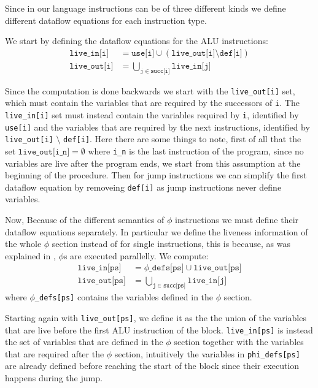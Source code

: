 Since in our language instructions can be of three different kinds we define different dataflow equations for each instruction type.

We start by defining the dataflow equations for the ALU instructions:
\begin{align*}
  \texttt{live\_in[i]} &= \texttt{use[i]} \cup (\texttt{live\_out[i]} \setminus \texttt{def[i]}) \\
  \texttt{live\_out[i]} &= \bigcup \limits_{\texttt j \in \texttt{succ[i]}} \texttt{live\_in[j]}
\end{align*}

Since the computation is done backwards we start with the \texttt{live\_out[i]} set, which must contain the variables that are required by the successors of \texttt i. The
\texttt{live\_in[i]} set must instead contain the variables required by \texttt i, identified by \texttt{use[i]} and the variables that are required by the next instructions, identified by \texttt{live\_out[i]} $\setminus$ \texttt{def[i]}.
Here there are some things to note, first of all that the set $\texttt{live\_out[i\_n]} = \emptyset$ where \texttt{i\_n} is the last instruction of the program, since no variables are live after the program ends, we start from this assumption at the beginning of the procedure.
Then for jump instructions we can simplify the first dataflow equation by removeing \texttt{def[i]} as jump instructions never define variables.

Now, Because of the different semantics of $\phi$ instructions we must define their dataflow equations separately. In particular we define the liveness information of the whole $\phi$ section instead of for single instructions, this is because, as was explained in , $\phi$s are executed parallelly.
We compute:
\begin{align*}
  \texttt{live\_in[ps]} &= \texttt{$\phi$\_defs[ps]} \cup \texttt{live\_out[ps]} \\
  \texttt{live\_out[ps]} &= \bigcup \limits_{\texttt j \in \texttt{succ[ps]}} \texttt{live\_in[j]}
\end{align*}
where \texttt{$\phi$\_defs[ps]} contains the variables defined in the $\phi$ section.

Starting again with \texttt{live\_out[ps]}, we define it as the the union of the variables that are live before the first ALU instruction of the block. \texttt{live\_in[ps]} is instead the set of variables that are defined in the $\phi$ section together with the variables that are required after the $\phi$ section, intuitively the variables in \texttt{phi\_defs[ps]} are already defined before reaching the start of the block since their execution happens during the jump.


